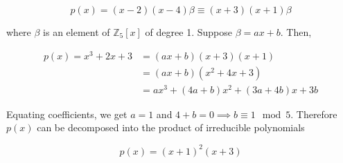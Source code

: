 \documentclass{article}
\begin{document}
\begin{equation*}
    p(x) = (x - 2)(x - 4)\beta \equiv (x + 3)(x + 1)\beta
\end{equation*}

where $\beta$ is an element of $\mathbb{Z}_5[x]$ of degree 1. Suppose
$\beta = ax + b$. Then,

\begin{align*}
    p(x) = x^3 + 2x + 3 &= (ax + b)(x + 3)(x + 1)\\
    &= (ax + b)(x^2 + 4x + 3)\\
    &= ax^3 + (4a + b)x^2 + (3a + 4b)x + 3b
\end{align*}

Equating coefficients, we get $a = 1$ and $4 + b = 0 \implies b \equiv 1\mod5$. Therefore
$p(x)$ can be decomposed into the product of irreducible polynomials

\begin{equation*}
    p(x) = (x + 1)^2(x + 3)
\end{equation*}
\end{document}
